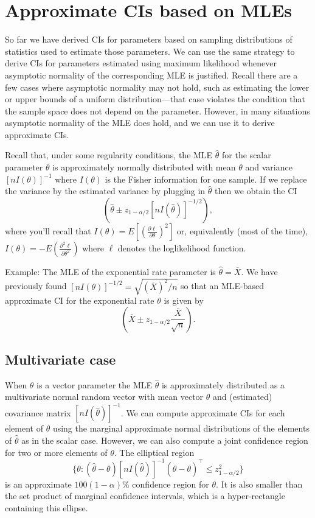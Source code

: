 \documentclass[]{book}
\begin{document}
\section{Approximate CIs based on
MLEs}\label{approximate-cis-based-on-mles}

So far we have derived CIs for parameters based on sampling
distributions of statistics used to estimate those parameters. We can
use the same strategy to derive CIs for parameters estimated using
maximum likelihood whenever asymptotic normality of the corresponding
MLE is justified. Recall there are a few cases where asymptotic
normality may not hold, such as estimating the lower or upper bounds of
a uniform distribution---that case violates the condition that the
sample space does not depend on the parameter. However, in many
situations asymptotic normality of the MLE does hold, and we can use it
to derive approximate CIs.

Recall that, under some regularity conditions, the MLE \(\hat\theta\)
for the scalar parameter \(\theta\) is approximately normally
distributed with mean \(\theta\) and variance \([nI(\theta)]^{-1}\)
where \(I(\theta)\) is the Fisher information for one sample. If we
replace the variance by the estimated variance by plugging in
\(\hat\theta\) then we obtain the CI
\[\left(\hat\theta \pm z_{1-\alpha/2}[nI(\hat\theta)]^{-1/2}\right),\]
where you'll recall that
\(I(\theta) = E\left[\left(\frac{\partial \ell}{\partial \theta}\right)^2\right]\)
or, equivalently (most of the time),
\(I(\theta) = -E\left(\frac{\partial^2 \ell}{\partial \theta^2}\right)\)
where \(\ell\) denotes the loglikelihood function.

Example: The MLE of the exponential rate parameter is
\(\hat\theta = \overline X\). We have previously found
\([nI(\theta)]^{-1/2} = \sqrt{(\overline X)^2/n}\) so that an MLE-based
approximate CI for the exponential rate \(\theta\) is given by
\[\left(\overline X \pm z_{1-\alpha/2}\frac{\overline X}{\sqrt{n}}\right).\]

\subsection{Multivariate case}\label{multivariate-case}

When \(\theta\) is a vector parameter the MLE \(\hat\theta\) is
approximately distributed as a multivariate normal random vector with
mean vector \(\theta\) and (estimated) covariance matrix
\([nI(\hat\theta)]^{-1}\). We can compute approximate CIs for each
element of \(\theta\) using the marginal approximate normal
distributions of the elements of \(\hat\theta\) as in the scalar case.
However, we can also compute a joint confidence region for two or more
elements of \(\theta\). The elliptical region
\[\{\theta: (\hat \theta - \theta)[nI(\hat\theta)]^{-1}(\hat \theta - \theta)^\top \leq z_{1-\alpha/2}^2\}\]
is an approximate \(100(1-\alpha)\%\) confidence region for \(\theta\).
It is also smaller than the set product of marginal confidence
intervals, which is a hyper-rectangle containing this ellipse.
\end{document}
